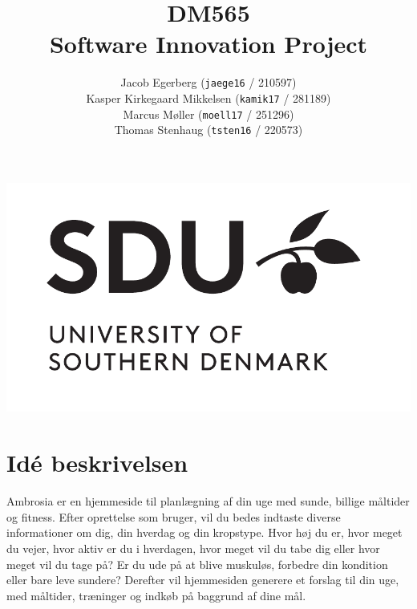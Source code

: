 \documentclass[a4paper,]{article}
\begin{document}
\chead{}
\cfoot{}

\title{DM565\\Software Innovation Project}
\date{}
\author{
  Jacob Egerberg (\texttt{jaege16} / 210597) \\
  Kasper Kirkegaard Mikkelsen (\texttt{kamik17} / 281189) \\
  Marcus Møller (\texttt{moell17} / 251296) \\
  Thomas Stenhaug (\texttt{tsten16} / 220573)}

\maketitle

\vspace*{\fill}
\begin{center}
  \includegraphics[width=1.05\textwidth]{SDUlogo.pdf}
\end{center}

\thispagestyle{empty}
\newpage

\tableofcontents
\newpage


\section{Idé beskrivelsen}
Ambrosia er en hjemmeside til planlægning af din uge med sunde, billige måltider og fitness. Efter oprettelse som bruger, vil du bedes indtaste diverse informationer om dig, din hverdag og din kropstype. Hvor høj du er, hvor meget du vejer, hvor aktiv er du i hverdagen, hvor meget vil du tabe dig eller hvor meget vil du tage på? Er du ude på at blive muskuløs, forbedre din kondition eller bare leve sundere? Derefter vil hjemmesiden generere et forslag til din uge, med måltider, træninger og indkøb på baggrund af dine mål. 
\end{document}
